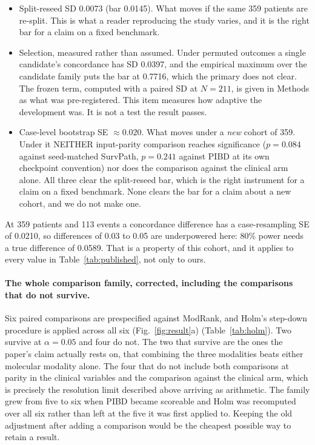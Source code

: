 \documentclass[11pt]{article}
\begin{document}
\begin{itemize}
  \item Split-reseed SD 0.0073 (bar 0.0145). What moves if the same 359 patients are
    re-split. This is what a reader reproducing the study varies, and it is the right bar for a
    claim on a fixed benchmark.
  \item Selection, measured rather than assumed. Under permuted outcomes a single candidate's
    concordance has SD 0.0397, and the empirical maximum over the candidate family puts the
    bar at 0.7716, which the primary does not clear. The frozen term, computed with a paired SD
    at $N=211$, is given in Methods as what was pre-registered. This item measures how adaptive
    the development was. It is not a test the result passes.
  \item Case-level bootstrap SE $\approx 0.020$. What moves under a \emph{new} cohort of
    359. Under it NEITHER input-parity comparison reaches significance ($p=0.084$ against seed-matched SurvPath, $p=0.241$ against PIBD at its own checkpoint convention) nor does
    the comparison against the clinical arm alone. All three clear the split-reseed bar, which is
    the right instrument for a claim on a fixed benchmark. None clears the bar for a claim about a
    new cohort, and we do not make one.
\end{itemize}

At 359 patients and 113 events a concordance difference has a case-resampling SE of 0.0210, so
differences of 0.03 to 0.05 are underpowered here: 80\% power needs a true difference of 0.0589.
That is a property of this cohort, and it applies to every value in Table~\ref{tab:published},
not only to ours.

\paragraph{The whole comparison family, corrected, including the comparisons that do not survive.}
Six paired comparisons are prespecified against ModRank, and Holm's step-down procedure is applied
across all six (Fig.~\ref{fig:result}a) (Table~\ref{tab:holm}). Two survive at $\alpha=0.05$ and four do not. The
two that survive are the ones the paper's claim actually rests on, that combining the three
modalities beats either molecular modality alone. The four that do not include both comparisons at
parity in the clinical variables and the comparison against the clinical arm, which is precisely the resolution limit
described above arriving as arithmetic. The family grew from five to six when PIBD became scoreable
and Holm was recomputed over all six rather than left at the five it was first applied to. Keeping the old adjustment after adding a comparison would be the cheapest possible way to retain a result.
\end{document}
